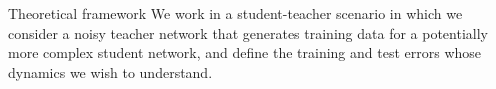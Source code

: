 \documentclass[final]{beamer}
\begin{document}
\begin{frame}[t]{}
\begin{columns}
\begin{column}{0.25\textwidth}



\begin{block}{\large Theoretical framework}
We work in a student-teacher scenario in which we consider a noisy teacher network that generates training data for a potentially more complex student network, and define the training and test errors whose dynamics we wish to understand. \par 


\end{block}
\end{column}
\end{columns}
\end{frame}
\end{document}
